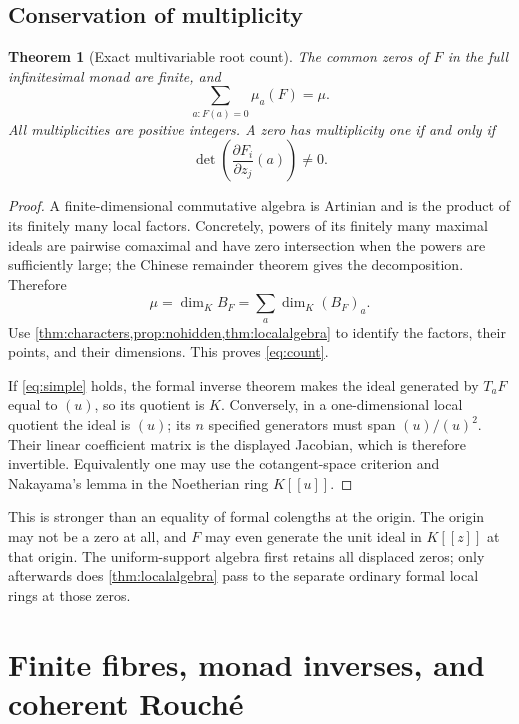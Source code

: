 \documentclass[11pt,letterpaper]{article}
\newtheorem{theorem}{Theorem}[section]
\theoremstyle{definition}
\theoremstyle{remark}
\numberwithin{equation}{section}
\begin{document}
\subsection{Conservation of multiplicity}
\begin{theorem}[Exact multivariable root count]\label{thm:count}
The common zeros of $F$ in the full infinitesimal monad are finite, and
\begin{equation}\label{eq:count}
 \boxed{\displaystyle\sum_{a:F(a)=0}\mu_a(F)=\mu.}
\end{equation}
All multiplicities are positive integers. A zero has multiplicity one if and only if
\begin{equation}\label{eq:simple}
 \det\left(\frac{\partial F_i}{\partial z_j}(a)\right)\ne0.
\end{equation}
\end{theorem}
\begin{proof}
A finite-dimensional commutative algebra is Artinian and is the product of its finitely many local factors. Concretely, powers of its finitely many maximal ideals are pairwise comaximal and have zero intersection when the powers are sufficiently large; the Chinese remainder theorem gives the decomposition. Therefore
\[
 \mu=\dim_KB_F=\sum_a\dim_K(B_F)_a.
\]
Use \cref{thm:characters,prop:nohidden,thm:localalgebra} to identify the factors, their points, and their dimensions. This proves \eqref{eq:count}.

If \eqref{eq:simple} holds, the formal inverse theorem makes the ideal generated by $T_aF$ equal to $(u)$, so its quotient is $K$. Conversely, in a one-dimensional local quotient the ideal is $(u)$; its $n$ specified generators must span $(u)/(u)^2$. Their linear coefficient matrix is the displayed Jacobian, which is therefore invertible. Equivalently one may use the cotangent-space criterion and Nakayama's lemma in the Noetherian ring $K[[u]]$.
\end{proof}
This is stronger than an equality of formal colengths at the origin. The origin may not be a zero at all, and $F$ may even generate the unit ideal in $K[[z]]$ at that origin. The uniform-support algebra first retains all displaced zeros; only afterwards does \cref{thm:localalgebra} pass to the separate ordinary formal local rings at those zeros.

\section{Finite fibres, monad inverses, and coherent Rouch\'e}\label{sec:fibres}
\end{document}
